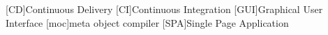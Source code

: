 \begin{acronym}[IEEE]
	[CD]{Continuous Delivery}
	[CI]{Continuous Integration}
	[GUI]{Graphical User Interface}
	[moc]{meta object compiler}
	[SPA]{Single Page Application}
\end{acronym}
